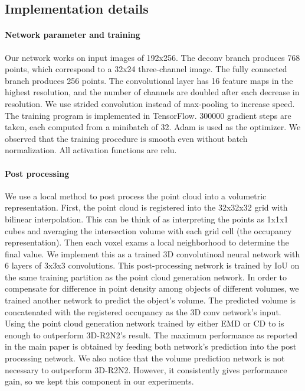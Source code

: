 \subsection{Implementation details}
\label{sec:impl_details}
\paragraph{Network parameter and training}
Our network works on input images of 192x256. The deconv branch produces 768 points, which correspond to a 32x24 three-channel image. The fully connected branch produces 256 points. The convolutional layer has 16 feature maps in the highest resolution, and the number of channels are doubled after each decrease in resolution. We use strided convolution instead of max-pooling to increase speed. The training program is implemented in TensorFlow. 300000 gradient steps are taken, each computed from a minibatch of 32. Adam is used as the optimizer. We observed that the training procedure is smooth even without batch normalization. All activation functions are relu.

\paragraph{Post processing}
We use a local method to post process the point cloud into a volumetric representation. First, the point cloud is registered into the 32x32x32 grid with bilinear interpolation. This can be think of as interpreting the points as 1x1x1 cubes and averaging the intersection volume with each grid cell (the occupancy representation). Then each voxel exams a local neighborhood to determine the final value. We implement this as a trained 3D convolutinoal neural network with 6 layers of 3x3x3 convolutions. This post-processing network is trained by IoU on the same training partition as the point cloud generation network. In order to compensate for difference in point density among objects of different volumes, we trained another network to predict the object's volume. The predicted volume is concatenated with the registered occupancy as the 3D conv network's input. Using the point cloud generation network trained by either EMD or CD to is enough to outperform 3D-R2N2's result. The maximum performance as reported in the main paper is obtained by feeding both     network's prediction into the post processing network. We also notice that the volume prediction network is not necessary to outperform 3D-R2N2. However, it consistently gives performance gain, so we kept this component in our experiments.
